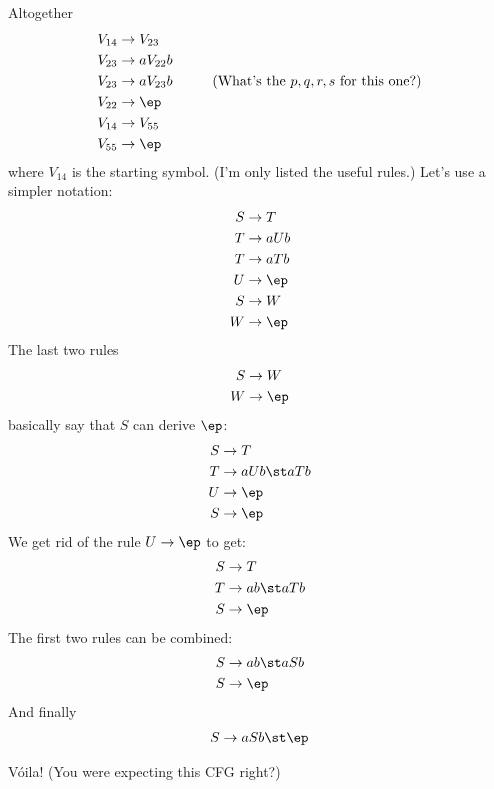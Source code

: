 Altogether
\begin{align*}
V_{14} &\rightarrow V_{23} \\
V_{23} &\rightarrow a V_{22} b \\
V_{23} &\rightarrow a V_{23} b  \hskip 1cm (\text{What's the $p,q,r,s$ for this one?})\\
V_{22} &\rightarrow \ep \\
V_{14} &\rightarrow V_{55} \\
V_{55} &\rightarrow \ep \\
\end{align*}
where $V_{14}$ is the starting symbol.
(I'm only listed the useful rules.)
Let's use a simpler notation:
\begin{align*}
S &\rightarrow T \\
T &\rightarrow a U b \\
T &\rightarrow a T b  \\
U &\rightarrow \ep \\
S &\rightarrow W \\
W &\rightarrow \ep \\
\end{align*}
The last two rules 
\begin{align*}
S &\rightarrow W \\
W &\rightarrow \ep \\
\end{align*}
basically say that $S$ can derive $\ep$:
\begin{align*}
S &\rightarrow T \\
T &\rightarrow a U b \st aTb \\
U &\rightarrow \ep \\
S &\rightarrow \ep
\end{align*}
We get rid of the rule $U \rightarrow \ep$ to get:
\begin{align*}
S &\rightarrow T \\
T &\rightarrow a b \st aTb \\
S &\rightarrow \ep
\end{align*}
The first two rules can be combined:
\begin{align*}
S &\rightarrow a b \st aSb \\
S &\rightarrow \ep
\end{align*}
And finally
\begin{align*}
S &\rightarrow aSb \st \ep \\
\end{align*}

V\'oila! (You were expecting this CFG right?)

